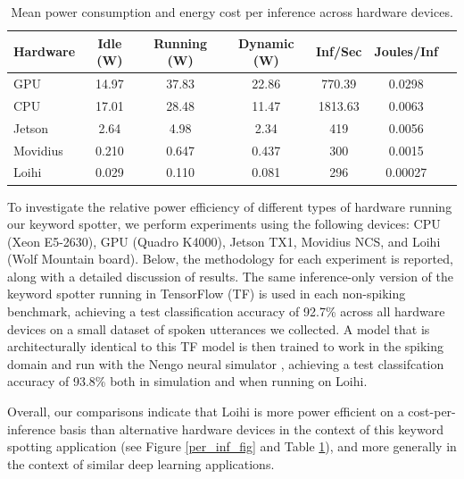 \documentclass{article}
\begin{document}
\begin{table}[t!]
\caption{Mean power consumption and energy cost per inference across hardware devices.} 
\vskip 0.15in
\begin{center}
\begin{small}
\begin{sc}
\begin{tabular}{lcccccc}
\hline
\abovespace\belowspace
Hardware & Idle (W) & Running (W) & Dynamic (W) & Inf/Sec & Joules/Inf \\
\hline
\abovespace
GPU & 14.97 & 37.83 & 22.86 & 770.39 & 0.0298 \\   
CPU & 17.01 & 28.48 & 11.47 & 1813.63 & 0.0063 \\
Jetson & 2.64 & 4.98 & 2.34 & 419 & 0.0056 \\
Movidius & 0.210 & 0.647 & 0.437 & 300 & 0.0015 \\
\belowspace
Loihi & 0.029 & 0.110 & 0.081 & 296 & 0.00027 \\

\hline
\end{tabular}
\end{sc}
\end{small}
\end{center}
\vskip -0.1in
\label{power-table}
\end{table}

To investigate the relative power efficiency of different types of hardware running our keyword spotter, we perform experiments using the following devices: CPU (Xeon E5-2630), GPU (Quadro K4000), Jetson TX1, Movidius NCS, and Loihi (Wolf Mountain board). Below, the methodology for each experiment is reported, along with a detailed discussion of results. The same inference-only version of the keyword spotter running in TensorFlow (TF) is used in each non-spiking benchmark, achieving a test classification accuracy of 92.7\% across all hardware devices on a small dataset of spoken utterances we collected. A model that is architecturally identical to this TF model is then trained to work in the spiking domain \cite{Hunsberger:2016} and run with the Nengo neural simulator \cite{Bekolay:2014}, achieving a test classifcation accuracy of 93.8\% both in simulation and when running on Loihi.

Overall, our comparisons indicate that Loihi is more power efficient on a cost-per-inference basis than alternative hardware devices in the context of this keyword spotting application (see Figure \ref{per_inf_fig} and Table \ref{power-table}), and more generally in the context of similar deep learning applications.
\end{document}
